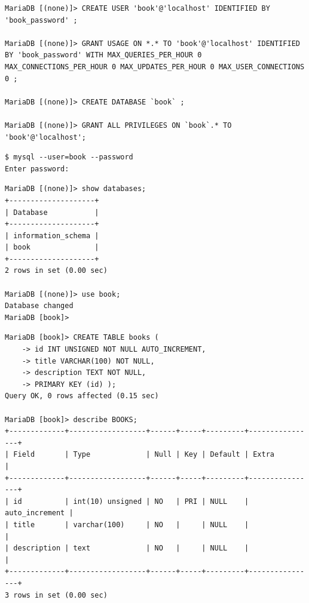 \documentclass{assignment}
\begin{document}
\begin{verbatim}
MariaDB [(none)]> CREATE USER 'book'@'localhost' IDENTIFIED BY 'book_password' ;

MariaDB [(none)]> GRANT USAGE ON *.* TO 'book'@'localhost' IDENTIFIED BY 'book_password' WITH MAX_QUERIES_PER_HOUR 0 MAX_CONNECTIONS_PER_HOUR 0 MAX_UPDATES_PER_HOUR 0 MAX_USER_CONNECTIONS 0 ;

MariaDB [(none)]> CREATE DATABASE `book` ;

MariaDB [(none)]> GRANT ALL PRIVILEGES ON `book`.* TO 'book'@'localhost';

\end{verbatim}

\begin{verbatim}
$ mysql --user=book --password
Enter password: 
\end{verbatim} 


\begin{verbatim}
MariaDB [(none)]> show databases;
+--------------------+
| Database           |
+--------------------+
| information_schema |
| book               |
+--------------------+
2 rows in set (0.00 sec)

MariaDB [(none)]> use book;
Database changed
MariaDB [book]> 

\end{verbatim}

\begin{verbatim}
MariaDB [book]> CREATE TABLE books (
    -> id INT UNSIGNED NOT NULL AUTO_INCREMENT,
    -> title VARCHAR(100) NOT NULL,
    -> description TEXT NOT NULL,
    -> PRIMARY KEY (id) );
Query OK, 0 rows affected (0.15 sec)

MariaDB [book]> describe BOOKS;
+-------------+------------------+------+-----+---------+----------------+
| Field       | Type             | Null | Key | Default | Extra          |
+-------------+------------------+------+-----+---------+----------------+
| id          | int(10) unsigned | NO   | PRI | NULL    | auto_increment |
| title       | varchar(100)     | NO   |     | NULL    |                |
| description | text             | NO   |     | NULL    |                |
+-------------+------------------+------+-----+---------+----------------+
3 rows in set (0.00 sec)


\end{verbatim}
\end{document}
